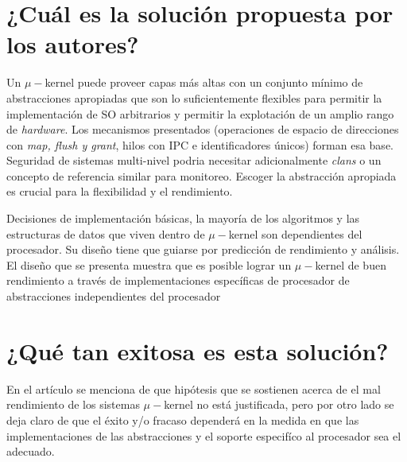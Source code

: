      
\section{¿Cuál es la solución propuesta por los autores?}
Un $\mu-$kernel puede proveer capas más altas con un conjunto mínimo de abstracciones apropiadas que son lo suficientemente flexibles para permitir la implementación de SO arbitrarios y permitir la explotación de un amplio rango de \textit{hardware}. Los mecanismos presentados (operaciones de espacio de direcciones con \textit{map, flush \textnormal{y} grant}, hilos con IPC e identificadores únicos) forman esa base. Seguridad de sistemas multi-nivel podria necesitar adicionalmente \textit{clans} o un concepto de referencia similar para monitoreo. Escoger la abstracción apropiada es crucial para la flexibilidad y el rendimiento. 

Decisiones de implementación básicas, la mayoría de los algoritmos y las estructuras de datos que viven dentro de $\mu-$kernel son dependientes del procesador. Su diseño tiene que guiarse por predicción de rendimiento y análisis. El diseño que se presenta muestra que es posible lograr un $\mu-$kernel de buen rendimiento a través de implementaciones específicas de procesador de abstracciones independientes del procesador

\section{¿Qué tan exitosa es esta solución?} 
En el artículo se menciona de que hipótesis que se sostienen acerca de el mal rendimiento de los sistemas $\mu-$kernel no está justificada, pero por otro lado se deja claro de que el éxito y/o fracaso dependerá en la medida en que las implementaciones de las abstracciones y el soporte especifíco al procesador sea el adecuado.
